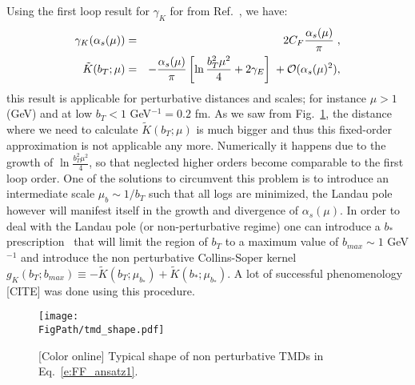\documentclass[final,3p,times,onecolumn,sort&compress,hidelinks]{elsarticle}
\newcommand\3[1]{\boldsymbol{#1}}
\newcommand*{\FigPath}{../Figs/}%
\begin{document}
Using the first loop result for $\gamma_K$ for from Ref.~\cite{Aybat:2011zv}, we have:
\begin{eqnarray}
\gamma_K(\alpha_s(\mu)) &=& 2 C_F \frac{\alpha_s(\mu)}{\pi} \; ,\\
\tilde K (b_T;\mu) &=& -\frac{\alpha_s(\mu)}{\pi}  \left[\ln\frac{b_T^2 \mu^2}{4} + 2 \gamma_E
 \right] \; + {\cal O} (\alpha_s(\mu)^2),
 \label{e:CS_kernel}
\end{eqnarray}
this result is applicable for perturbative distances and scales; for instance $\mu > 1$ (GeV) and at low $b_T < 1$  GeV$^{-1} = 0.2$ fm.
As we saw from Fig.~\ref{Fig:tmd_shape}, the distance where we need to calculate $\tilde K (b_T;\mu)$ is much bigger and thus this fixed-order approximation is not applicable any more.  Numerically it happens due to the growth of $\ln\frac{b_T^2 \mu^2}{4} $, so that neglected higher orders become comparable to the first loop order. One of the solutions to circumvent this problem is to introduce an intermediate scale $\mu_b \sim 1/b_T$ such that all logs are minimized, the Landau pole however will manifest itself in the growth and divergence of $\alpha_s(\mu)$. In order to deal with the Landau pole (or non-perturbative regime) one can introduce a $b_*$ prescription~\cite{Collins:2011zzd} that will limit the region of $b_T$ to a maximum value of $b_{max} \sim 1$ GeV$^{-1}$ and introduce the non perturbative Collins-Soper kernel $g_K(b_T; b_{max}) \equiv - \tilde K(b_T; \mu_{b_*}) + \tilde K(b_*; \mu_{b_*})$. A lot of successful phenomenology [CITE] was done using this procedure.



\begin{figure}[htb!]
\centering
\texttt{[image: \\FigPath/tmd\_shape.pdf]}
\caption{\label{Fig:tmd_shape}
[Color online] Typical shape of non perturbative TMDs in Eq.~\eqref{e:FF_ansatz1}.
}
\end{figure}
\end{document}
